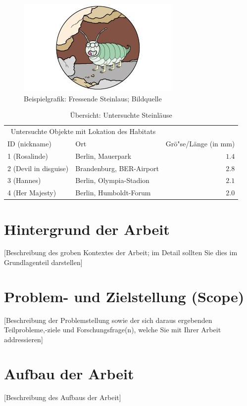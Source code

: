 \documentclass[oneside,bibliography=totocnumbered,BCOR=5mm]{scrbook}%
\theoremstyle{definition}
\theoremstyle{definition}
\theoremstyle{definition}
\theoremstyle{definition}
\theoremstyle{definition}
\theoremstyle{definition}
\begin{document}
\begin{figure}
\centering
\includegraphics{steinlaus2.jpg}
  \caption{Beispielgrafik: Fressende Steinlaus; Bildquelle \autocite{loriot2}}
\end{figure}

\begin{table}
\caption{\"Ubersicht: Untersuchte Steinl\"ause}
\centering
\begin{tabular}{llr}
\toprule
\multicolumn{2}{c}{Untersuchte Objekte mit Lokation des Habitats} \\
\cmidrule(r){1-2}
ID (nickname) & Ort & Gr\"o"se/L\"ange (in mm) \\
\midrule
1 (Rosalinde) & Berlin, Mauerpark & $1.4$ \\
2 (Devil in disguise) & Brandenburg, BER-Airport & $2.8$ \\
3 (Hannes) & Berlin, Olympia-Stadion & $2.1$ \\
4 (Her Majesty) & Berlin, Humboldt-Forum & $2.0$ \\
\bottomrule
\end{tabular}
\end{table}

\section{Hintergrund der Arbeit}
[Beschreibung des groben Kontextes der Arbeit; im Detail sollten Sie dies im Grundlagenteil darstellen] 


\section{Problem- und Zielstellung (Scope)}
[Beschreibung der Problemstellung sowie der sich daraus ergebenden Teilprobleme,-ziele und Forschungsfrage(n), welche Sie mit Ihrer Arbeit addressieren]


\section{Aufbau der Arbeit}
[Beschreibung des Aufbaus der Arbeit]
\end{document}
